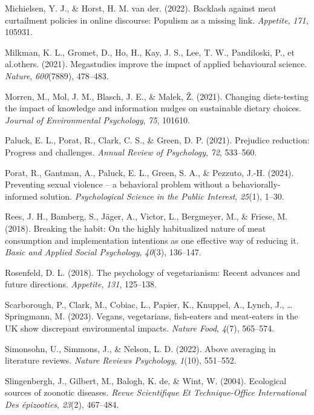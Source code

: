 \documentclass[
  man]{apa6}
\newlength{\cslhangindent}
\newenvironment{CSLReferences}[2] %
 {\begin{list}{}{%
  \setlength{\itemindent}{0pt}
  \setlength{\leftmargin}{0pt}
  \setlength{\parsep}{0pt}
  \ifodd #1
   \setlength{\leftmargin}{\cslhangindent}
   \setlength{\itemindent}{-1\cslhangindent}
  \fi
  \setlength{\itemsep}{#2\baselineskip}}}
 {\end{list}}
\begin{document}
\begin{CSLReferences}{1}{0}
Michielsen, Y. J., \& Horst, H. M. van der. (2022). Backlash against meat curtailment policies in online discourse: Populism as a missing link. \emph{Appetite}, \emph{171}, 105931.

Milkman, K. L., Gromet, D., Ho, H., Kay, J. S., Lee, T. W., Pandiloski, P., et al.others. (2021). Megastudies improve the impact of applied behavioural science. \emph{Nature}, \emph{600}(7889), 478--483.

Morren, M., Mol, J. M., Blasch, J. E., \& Malek, Ž. (2021). Changing diets-testing the impact of knowledge and information nudges on sustainable dietary choices. \emph{Journal of Environmental Psychology}, \emph{75}, 101610.

Paluck, E. L., Porat, R., Clark, C. S., \& Green, D. P. (2021). Prejudice reduction: Progress and challenges. \emph{Annual Review of Psychology}, \emph{72}, 533--560.

Porat, R., Gantman, A., Paluck, E. L., Green, S. A., \& Pezzuto, J.-H. (2024). Preventing sexual violence -- a behavioral problem without a behaviorally-informed solution. \emph{Psychological Science in the Public Interest}, \emph{25}(1), 1--30.

Rees, J. H., Bamberg, S., Jäger, A., Victor, L., Bergmeyer, M., \& Friese, M. (2018). Breaking the habit: On the highly habitualized nature of meat consumption and implementation intentions as one effective way of reducing it. \emph{Basic and Applied Social Psychology}, \emph{40}(3), 136--147.

Rosenfeld, D. L. (2018). The psychology of vegetarianism: Recent advances and future directions. \emph{Appetite}, \emph{131}, 125--138.

Scarborough, P., Clark, M., Cobiac, L., Papier, K., Knuppel, A., Lynch, J., \ldots{} Springmann, M. (2023). Vegans, vegetarians, fish-eaters and meat-eaters in the UK show discrepant environmental impacts. \emph{Nature Food}, \emph{4}(7), 565--574.

Simonsohn, U., Simmons, J., \& Nelson, L. D. (2022). Above averaging in literature reviews. \emph{Nature Reviews Psychology}, \emph{1}(10), 551--552.

Slingenbergh, J., Gilbert, M., Balogh, K. de, \& Wint, W. (2004). Ecological sources of zoonotic diseases. \emph{Revue Scientifique Et Technique-Office International Des {é}pizooties}, \emph{23}(2), 467--484.


\end{CSLReferences}
\end{document}
